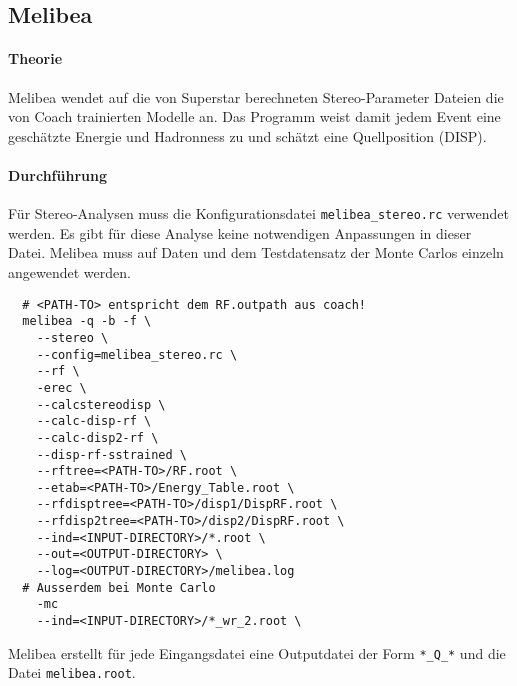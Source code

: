 \subsection{Melibea}%
\label{sub:melibea}

\paragraph{Theorie}

Melibea wendet auf die von Superstar berechneten
Stereo-Parameter Dateien
die von Coach trainierten Modelle an.
Das Programm weist damit jedem Event
eine geschätzte Energie und Hadronness zu
und schätzt eine Quellposition (DISP).



\paragraph{Durchführung}%

Für Stereo-Analysen muss die Konfigurationsdatei \texttt{melibea\_stereo.rc}
verwendet werden.
Es gibt für diese Analyse keine notwendigen Anpassungen in dieser Datei.
Melibea muss auf Daten und dem Testdatensatz der Monte Carlos einzeln angewendet werden.

\begin{lstlisting}
  # <PATH-TO> entspricht dem RF.outpath aus coach!
  melibea -q -b -f \
    --stereo \
    --config=melibea_stereo.rc \
    --rf \
    -erec \
    --calcstereodisp \
    --calc-disp-rf \
    --calc-disp2-rf \
    --disp-rf-sstrained \
    --rftree=<PATH-TO>/RF.root \
    --etab=<PATH-TO>/Energy_Table.root \
    --rfdisptree=<PATH-TO>/disp1/DispRF.root \
    --rfdisp2tree=<PATH-TO>/disp2/DispRF.root \
    --ind=<INPUT-DIRECTORY>/*.root \
    --out=<OUTPUT-DIRECTORY> \
    --log=<OUTPUT-DIRECTORY>/melibea.log
  # Ausserdem bei Monte Carlo
    -mc
    --ind=<INPUT-DIRECTORY>/*_wr_2.root \
\end{lstlisting}

Melibea erstellt für jede Eingangsdatei eine Outputdatei der
Form \texttt{*\_Q\_*} und die Datei \texttt{melibea.root}.
